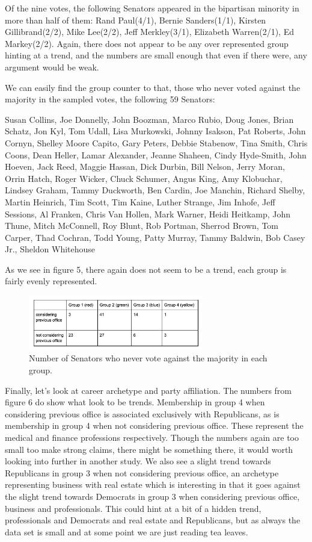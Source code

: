 \documentclass[11pt,twocolumn]{article}
\begin{document}
Of the nine votes, the following Senators appeared in the bipartisan minority in more than half of them:
Rand Paul(4/1), Bernie Sanders(1/1), Kirsten Gillibrand(2/2), Mike Lee(2/2), Jeff Merkley(3/1), Elizabeth Warren(2/1), Ed Markey(2/2). Again, there does not appear to be any over represented group hinting at a trend, and the numbers are small enough that even if there were, any argument would be weak.

We can easily find the group counter to that, those who never voted against the majority in the sampled votes, the following 59 Senators:

Susan Collins, Joe Donnelly, John Boozman, Marco Rubio, Doug Jones, Brian Schatz, Jon Kyl, Tom Udall, Lisa Murkowski, Johnny Isakson, Pat Roberts, John Cornyn, Shelley Moore Capito, Gary Peters, Debbie Stabenow, Tina Smith, Chris Coons, Dean Heller, Lamar Alexander, Jeanne Shaheen, Cindy Hyde-Smith, John Hoeven, Jack Reed, Maggie Hassan, Dick Durbin, Bill Nelson, Jerry Moran, Orrin Hatch, Roger Wicker, Chuck Schumer, Angus King, Amy Klobuchar, Lindsey Graham, Tammy Duckworth, Ben Cardin, Joe Manchin, Richard Shelby, Martin Heinrich, Tim Scott, Tim Kaine, Luther Strange, Jim Inhofe, Jeff Sessions, Al Franken, Chris Van Hollen, Mark Warner, Heidi Heitkamp, John Thune, Mitch McConnell, Roy Blunt, Rob Portman, Sherrod Brown, Tom Carper, Thad Cochran, Todd Young, Patty Murray, Tammy Baldwin, Bob Casey Jr., Sheldon Whitehouse

As we see in figure 5, there again does not seem to be a trend, each group is fairly evenly represented.
\begin{figure}[H]
    \centering
    \includegraphics[width=3in]{major}
    \caption{Number of Senators who never vote against the majority in each group.}
    \label{fig:ds}
\end{figure}

Finally, let's look at career archetype and party affiliation. The numbers from figure 6 do show what look to be trends. Membership in group 4 when considering previous office is associated exclusively with Republicans, as is membership in group 4 when not considering previous office. These represent the medical and finance professions respectively. Though the numbers again are too small too make strong claims, there might be something there, it would worth looking into further in another study. We also see a slight trend towards Republicans in group 3 when not considering previous office, an archetype representing business with real estate which is interesting in that it goes against the slight trend towards Democrats in group 3 when considering previous office, business and professionals. This could hint at a bit of a hidden trend, professionals and Democrats and real estate and Republicans, but as always the data set is small and at some point we are just reading tea leaves.
\end{document}
